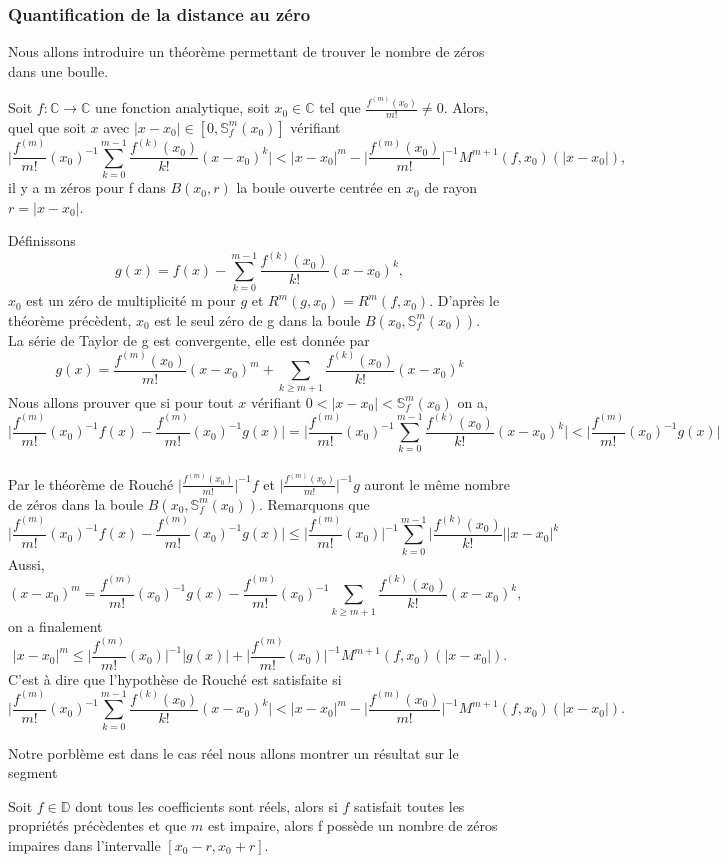 \documentclass[a4paper,10.5pt]{article}
\begin{document}
	\subsubsection{Quantification de la distance au zéro}

	
	\noindent Nous allons introduire un théorème permettant de trouver le nombre de zéros dans une boulle.
	
	\begin{theorem}
		Soit $f:\mathbb{C} \rightarrow \mathbb{C}$ une fonction analytique, soit $x_0 \in \mathbb{C}$ tel que $\frac{f^{(m)}(x_0)}{m!} \neq 0$. Alors, quel que soit $x$ avec $|x-x_0|\in [0,\mathbb{S}_{f}^{m}(x_0)]$ vérifiant
		\[\Big|\frac{f^{(m)}}{m!}(x_0)^{-1}\sum_{k=0}^{m-1}\frac{f^{(k)}(x_0)}{k!}(x-x_0)^k\Big|<|x-x_0|^{m}-\Big|\frac{f^{(m)}(x_0)}{m!}\Big|^{-1}M^{m+1}(f,x_0)(|x-x_0|),\]
		il y a m zéros pour f dans $B(x_0,r)$ la boule ouverte centrée en $x_0$ de rayon $r=|x-x_0|$. 
	\end{theorem}
	\begin{demonstration}
		Définissons \[g(x)=f(x)-\sum_{k=0}^{m-1}\frac{f^{(k)}(x_0)}{k!}(x-x_0)^k,\]
		$x_0$ est un zéro de multiplicité m pour $g$ et $R^{m}(g,x_0)=R^{m}(f,x_0)$. D'après le théorème précèdent, $x_0$ est le seul zéro de g dans la boule
		$B(x_0,\mathbb{S}_{f}^{m}(x_0))$.\\
		La série de Taylor de g est convergente, elle est donnée par
		\[g(x)=\frac{f^{(m)}(x_0)}{m!}(x-x_0)^m+ \sum_{k \geq m+1}\frac{f^{(k)}(x_0)}{k!}(x-x_0)^k\]
		Nous allons prouver que si pour tout $x$ vérifiant $0<|x-x_0|<\mathbb{S}_{f}^{m}(x_0)$ on a,
		\[\Big|\frac{f^{(m)}}{m!}(x_0)^{-1}f(x)-\frac{f^{(m)}}{m!}(x_0)^{-1}g(x)\Big|=\Big|\frac{f^{(m)}}{m!}(x_0)^{-1}\sum_{k=0}^{m-1}\frac{f^{(k)}(x_0)}{k!}(x-x_0)^k\Big|<\Big|\frac{f^{(m)}}{m!}(x_0)^{-1}g(x)\Big|\]
		\\
		Par le théorème de Rouché $\Big|\frac{f^{(m)}(x_0)}{m!}\Big|^{-1}f$ et $\Big|\frac{f^{(m)}(x_0)}{m!}\Big|^{-1}g$ auront le même nombre de zéros dans la boule $B(x_0,\mathbb{S}_{f}^{m}(x_0))$. Remarquons que 
		\[\Big|\frac{f^{(m)}}{m!}(x_0)^{-1}f(x)-\frac{f^{(m)}}{m!}(x_0)^{-1}g(x)\Big|\leq \Big|\frac{f^{(m)}}{m!}(x_0)\Big|^{-1}\sum_{k=0}^{m-1}\Big|\frac{f^{(k)}(x_0)}{k!}\Big||x-x_0|^k\]
		Aussi,
		\[(x-x_0)^{m}=\frac{f^{(m)}}{m!}(x_0)^{-1}g(x)-\frac{f^{(m)}}{m!}(x_0)^{-1}\sum_{k \geq m+1}\frac{f^{(k)}(x_0)}{k!}(x-x_0)^k,\]
		on a finalement
		\[|x-x_0|^{m} \leq \Big|\frac{f^{(m)}}{m!}(x_0)\Big|^{-1}|g(x)|+\Big|\frac{f^{(m)}}{m!}(x_0)\Big|^{-1}M^{m+1}(f,x_0)(|x-x_0|) .\]
		C'est à dire que l'hypothèse de Rouché est satisfaite si
		\[\Big|\frac{f^{(m)}}{m!}(x_0)^{-1}\sum_{k=0}^{m-1}\frac{f^{(k)}(x_0)}{k!}(x-x_0)^k\Big|<|x-x_0|^{m}-\Big|\frac{f^{(m)}(x_0)}{m!}\Big|^{-1}M^{m+1}(f,x_0)(|x-x_0|).\] 
	\end{demonstration}
	\vspace{7mm}
	\noindent Notre porblème est dans le cas réel nous allons montrer un résultat sur le segment
	\begin{theorem}
		Soit $f \in \mathbb{D}$ dont tous les coefficients sont réels, alors si $f$ satisfait toutes les propriétés précèdentes et que $m$ est impaire, alors f possède un nombre de zéros impaires dans l'intervalle $[x_0-r,x_0+r]$.
	\end{theorem}
\end{document}
